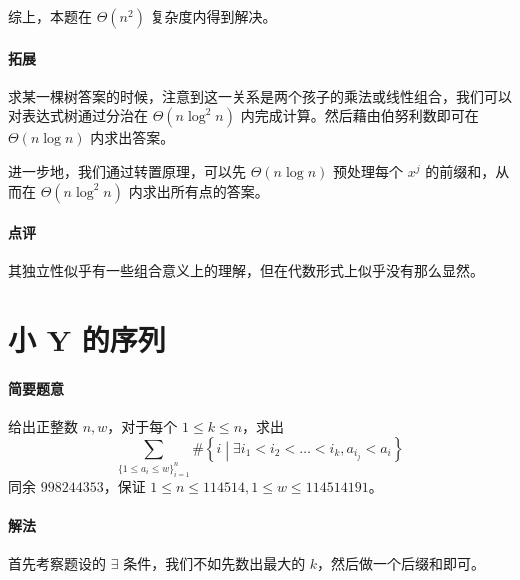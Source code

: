 \documentclass[12pt]{ctexart}
\theoremstyle{theorem}
\theoremstyle{theorem}
\begin{document}
综上，本题在 $\Theta(n^2)$ 复杂度内得到解决。

\paragraph{拓展} 求某一棵树答案的时候，注意到这一关系是两个孩子的乘法或线性组合，我们可以对表达式树通过分治在 $\Theta(n\log ^2 n)$ 内完成计算。然后藉由伯努利数即可在 $\Theta(n\log n)$ 内求出答案。

进一步地，我们通过转置原理，可以先 $\Theta(n\log n)$ 预处理每个 $x^j$ 的前缀和，从而在 $\Theta(n\log^2n)$ 内求出所有点的答案。

\paragraph{点评} 其独立性似乎有一些组合意义上的理解，但在代数形式上似乎没有那么显然。

\newpage

\section{小 Y 的序列}

\paragraph{简要题意}

给出正整数 $n, w$，对于每个 $1\le k\le n$，求出
$$
\sum_{\{1\le a_i\le w\}_{i=1}^n} \# \left\{
i \middle \vert \exists i_1<i_2<\dots <i_k, a_{i_j} < a_i
\right \}
$$
同余 $998244353$，保证 $1\le n\le 114514, 1\le w\le 114514191$。

\paragraph{解法}

首先考察题设的 $\exists$ 条件，我们不如先数出最大的 $k$，然后做一个后缀和即可。
\end{document}
